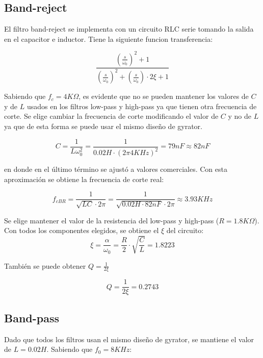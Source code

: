 \subsection{Band-reject}

El filtro band-reject se implementa con un circuito RLC serie tomando la salida en el capacitor e inductor. Tiene la siguiente funcion transferencia:

\begin{equation}
	\frac{\left(\frac{s}{\omega _0}\right)^2+1}{\left(\frac{s}{\omega _0}\right)^2+\left(\frac{s}{\omega _0}\right)\cdot 2\xi +1}
	\label{eq:ej2_BR_tf_syms}
\end{equation}

Sabiendo que $f_{c} = 4K\Omega$, es evidente que no se pueden mantener los valores de $C$ y de $L$ usados en los filtros low-pass y high-pass
ya que tienen otra frecuencia de corte. Se elige cambiar la frecuencia de corte modificando el valor de $C$ y no de $L$ ya que de esta forma se puede usar el mismo dise\~no de gyrator.

\begin{equation}
	C = \frac{1}{L \omega_0^2} = \frac{1}{0.02H\cdot (2\pi 4KHz)^2} = 79nF \approx 82nF
	\label{eq:ej2_BR_C}
\end{equation}

en donde en el \'ultimo t\'ermino se ajust\'o a valores comerciales. Con esta aproximaci\'on se obtiene la frecuencia de corte real:

\begin{equation}
	f_{cBR} = \frac{1}{\sqrt{LC}\cdot 2\pi} = \frac{1}{\sqrt{0.02H\cdot 82nF}\cdot 2\pi} \approx 3.93KHz 
	\label{eq:ej2_BR_f0}
\end{equation}

Se elige mantener el valor de la resistencia del low-pass y high-pass ($R=1.8K\Omega$). Con todos los componentes elegidos, se obtiene el $\xi$ del circuito:
\begin{equation}
	\xi = \frac{\alpha}{\omega_0} = \frac{R}{2}\cdot \sqrt{\frac{C}{L}} = 1.8223
	\label{eq:ej2_BR_xi}
\end{equation}

Tambi\'en se puede obtener $Q=\frac{1}{2\xi}$

\begin{equation}
	Q = \frac{1}{2\xi} = 0.2743
	\label{eq:ej2_BR_xi}
\end{equation}


\subsection{Band-pass}
Dado que todos los filtros usan el mismo dise\~no de gyrator, se mantiene el valor de $L=0.02H$. Sabiendo que $f_0=8KHz$:

